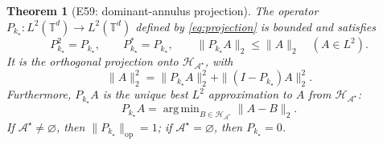 \documentclass[11pt]{article}
\newtheorem{theorem}{Theorem}
\DeclareMathOperator*{\argmin}{arg\,min}
\newcommand{\TT}{\mathbb{T}}
\newcommand{\calA}{\mathcal{A}^{\star}}
\newcommand{\calH}{\mathcal{H}_{\calA}}
\newcommand{\PA}{P_{k_{\star}}}
\begin{document}
\begin{theorem}[E59: dominant-annulus projection]\label{thm:e59}
The operator $\PA:L^{2}(\TT^{d})\to L^{2}(\TT^{d})$
defined by \eqref{eq:projection} is bounded and satisfies
\begin{equation}\label{eq:main}
\boxed{\PA^{2}=\PA,\qquad \PA^{*}=\PA,\qquad
\|\PA A\|_{2}\leq\|A\|_{2}\quad(A\in L^{2}).}
\end{equation}
It is the orthogonal projection onto $\calH$, with
\begin{equation}\label{eq:pythagoras}
\boxed{\|A\|_{2}^{2}=\|\PA A\|_{2}^{2}
              +\|(I-\PA)A\|_{2}^{2}.}
\end{equation}
Furthermore, $\PA A$ is the unique best $L^{2}$ approximation
to $A$ from $\calH$:
\begin{equation}\label{eq:best}
\boxed{\PA A=\argmin_{B\in\calH}\|A-B\|_{2}.}
\end{equation}
If $\calA\neq\varnothing$, then $\|\PA\|_{\mathrm{op}}=1$;
if $\calA=\varnothing$, then $\PA=0$.
\end{theorem}
\end{document}
